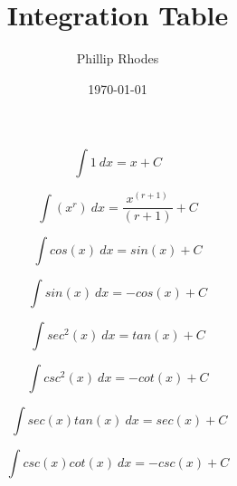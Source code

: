 \documentclass[fleqn]{article} %
\title{Integration Table} %
\author{Phillip Rhodes} %
\date{\today} %
\begin{document}
    \maketitle %
    
    \begin{equation}
      \int 1 \:dx = x + C
    \end{equation}

    \begin{equation}
      \int (x^r)\:dx =  \frac{ x^{(r+1)} }{(r+1)} + C
    \end{equation}
    
    \begin{equation}
      \int cos(x)\:dx = sin(x) + C
    \end{equation}

    \begin{equation}
      \int sin(x)\:dx = -cos(x) + C
    \end{equation}

    \begin{equation}
      \int sec^2(x)\:dx = tan(x) + C
    \end{equation}

    \begin{equation}
      \int csc^2(x)\:dx = -cot(x) + C
    \end{equation}

    \begin{equation}\
      \int sec(x)tan(x)\:dx = sec(x) + C
    \end{equation}

    \begin{equation}
      \int csc(x)cot(x)\:dx = -csc(x) + C
    \end{equation}
\end{document}
